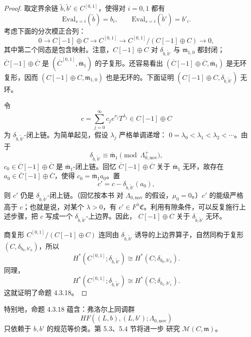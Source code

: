 \begin{proof}
取定界余链 $\widetilde b,\widetilde b'\in C^{[0,1]}$，使得对
$i=0,1$ 都有
\[
 \mathrm{Eval}_{s=i}(\widetilde b)=b_i,
 \qquad
 \mathrm{Eval}_{s=i}(\widetilde b')=b'_i.
\]
考虑下面的分次模正合列：
\[
 0\longrightarrow C[-1]\oplus C
 \longrightarrow C^{[0,1]}
 \longrightarrow C^{[0,1]}/(C[-1]\oplus C)
 \longrightarrow0,
\]
其中第二个同态是包含映射。注意，$C[-1]\oplus C$ 对
$\delta_{\widetilde b,\widetilde b'}$ 与 $\mathfrak m_{1,0}$ 都封闭；
$\overline C[-1]\oplus\overline C$ 是
$(\overline C^{[0,1]},\overline{\mathfrak m}_1)$ 的子复形。还容易看出
$(\overline C[-1]\oplus\overline C,\overline{\mathfrak m}_1)$ 是无环
复形，因而 $(C[-1]\oplus C,\mathfrak m_{1,0})$ 也是无环的。下面证明
$(C[-1]\oplus C,\delta_{\widetilde b,\widetilde b'})$ 无环。

令
\[
 c=\sum_{j=0}^{\infty}c_j e^{\nu_j}T^{\lambda_j}
 \in C[-1]\oplus C
\]
为 $\delta_{\widetilde b,\widetilde b'}$-闭上链。为简单起见，假设
$\lambda_j$ 严格单调递增：
$0=\lambda_0<\lambda_1<\lambda_2<\cdots$。由于
\[
 \delta_{\widetilde b,\widetilde b'}
 \equiv\overline{\mathfrak m}_1
 \pmod{\Lambda^+_{0,\mathrm{nov}}},
\]
$c_0\in\overline C[-1]\oplus\overline C$ 是
$\overline{\mathfrak m}_1$-闭上链。回忆
$\overline C[-1]\oplus\overline C$ 关于
$\overline{\mathfrak m}_1$ 无环，故存在
$a_0\in\overline C[-1]\oplus\overline C$，使得
$c_0=\overline{\mathfrak m}_1a_0$。置
\[
 c'=c-\delta_{\widetilde b,\widetilde b'}(a_0),
\]
则 $c'$ 仍是 $\delta_{\widetilde b,\widetilde b'}$-闭上链。（回忆按本书
对 $\Lambda_{0,\mathrm{nov}}$ 的假设，$\mu_0=0$。）$c'$ 的能级严格高于
$c$；也就是说，对某个 $\lambda>0$，有
$c'\in F^\lambda\mathfrak C$。利用有隙条件，可以反复施行上述步骤，把
$c$ 写成一个 $\delta_{\widetilde b,\widetilde b'}$-上边界。因此，
$C[-1]\oplus C$ 关于 $\delta_{\widetilde b,\widetilde b'}$ 无环。

商复形 $C^{[0,1]}/(C[-1]\oplus C)$ 连同由
$\delta_{\widetilde b,\widetilde b'}$ 诱导的上边界算子，自然同构于复形
$(C,\delta_{b_0,b'_0})$，所以
\[
 H^*(C^{[0,1]};\delta_{\widetilde b,\widetilde b'})
 \cong H^*(C;\delta_{b_0,b'_0}).
\]
同理，
\[
 H^*(C^{[0,1]};\delta_{\widetilde b,\widetilde b'})
 \cong H^*(C;\delta_{b_1,b'_1}).
\]
这就证明了命题 4.3.18。
\end{proof}

特别地，命题 4.3.18 蕴含：弗洛尔上同调群
\[
 HF((L,b),(L,b');\Lambda_{0,\mathrm{nov}})
\]
只依赖于 $b,b'$ 的规范等价类。第 5.3、5.4 节将进一步
研究 $\mathcal M(C,\mathfrak m)$。
